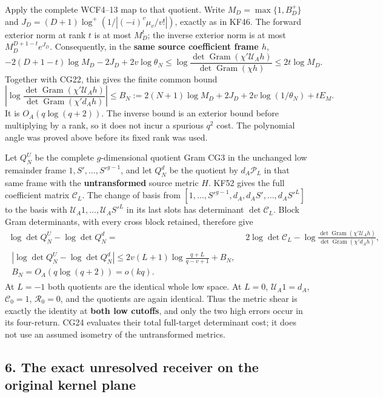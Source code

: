 Apply the complete WCF4--13 map to that quotient. Write \(M_D=\max\{1,B_D^+\}\) and \(J_D=(D+1)\log^+(1/|(-i)^v\mu_v/v!|)\), exactly as in KF46. The forward exterior norm at rank \(t\) is at most \(M_D^t\); the inverse exterior norm is at most \(M_D^{D+1-t}e^{J_D}\). Consequently, in the \textbf{same source coefficient frame \(h\)}, \[
-2(D+1-t)\log M_D-2J_D+2v\log\theta_N
\le\log\frac{\det\operatorname{Gram}(\chi'\mathcal U_Ah)}
{\det\operatorname{Gram}(\chi h)}
\le2t\log M_D.
\] Together with CG22, this gives the finite common bound \[
\left|\log\frac{\det\operatorname{Gram}(\chi'\mathcal U_Ah)}
{\det\operatorname{Gram}(\chi'd_Ah)}\right|
\le B_N:=2(N+1)\log M_D+2J_D+2v\log(1/\theta_N)+tE_M.
\] It is \(O_A(q\log(q+2))\). The inverse bound is an exterior bound before multiplying by a rank, so it does not incur a spurious \(q^2\) cost. The polynomial angle was proved above before its fixed rank was used.

Let \(Q_N^U\) be the complete \(g\)-dimensional quotient Gram CG3 in the unchanged low remainder frame \(1,S',\ldots,S'^{g-1}\), and let \(Q_N^d\) be the quotient by \(d_A\mathcal P_L\) in that same frame with the \textbf{untransformed} source metric \(H\). KF52 gives the full coefficient matrix \(\mathcal C_L\). The change of basis from \([1,\ldots,S'^{g-1},d_A,d_AS',\ldots,d_AS'^L]\) to the basis with \(\mathcal U_A1,\ldots,\mathcal U_AS'^L\) in its last slots has determinant \(\det\mathcal C_L\). Block Gram determinants, with every cross block retained, therefore give \[
\begin{split}
\log\det Q_N^U-\log\det Q_N^d
={}&2\log\det\mathcal C_L
-\log\frac{\det\operatorname{Gram}(\chi'\mathcal U_Ah)}
{\det\operatorname{Gram}(\chi'd_Ah)},\\
\boxed{\begin{gathered}|\log\det Q_N^U-\log\det Q_N^d|
\le 2v(L+1)\log\frac{q+L}{q-v+1}+B_N,\\ B_N=O_A(q\log(q+2))=o(kq).\end{gathered}}
\end{split}\tag{CG24}
\] At \(L=-1\) both quotients are the identical whole low space. At \(L=0\), \(\mathcal U_A1=d_A\), \(\mathcal C_0=1\), \(\mathcal R_0=0\), and the quotients are again identical. Thus the metric shear is exactly the identity at \textbf{both low cutoffs}, and only the two high errors occur in its four-return. CG24 evaluates their total full-target determinant cost; it does not use an assumed isometry of the untransformed metrics.

\subsection{6. The exact unresolved receiver on the original kernel plane}\label{the-exact-unresolved-receiver-on-the-original-kernel-plane}

